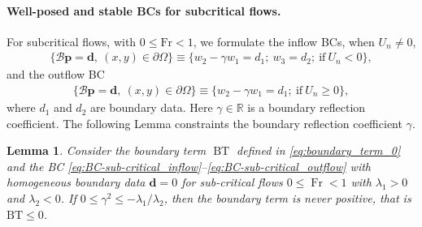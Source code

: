 \documentclass{article}
\numberwithin{equation}{section}
\newtheorem{lemma}{Lemma}
\theoremstyle{definition}
\begin{document}
\paragraph{Well-posed and stable BCs for subcritical flows.} For subcritical flows, with $0\le \mathrm{Fr}< 1$, we formulate the inflow BCs, when $U_n \ne 0$, 
%
%
    \begin{eqnarray}\label{eq:BC-sub-critical_inflow}
    \{\mathcal{B}\textbf{p}=\textbf{d},  \ (x,y) \in \partial \Omega \} \equiv \{ {w_2 - \gamma w_1 = d_1}; \ {w_3 = d_2}; \ \text{if} \ U_n < 0\},
    \end{eqnarray}
and the outflow BC
    \begin{eqnarray}\label{eq:BC-sub-critical_outflow}
    \{\mathcal{B}\textbf{p}=\textbf{d},  \ (x,y) \in \partial \Omega \} \equiv \{ {w_2 - \gamma w_1 = d_1};  \ \text{if} \ U_n \ge 0\},
    \end{eqnarray}
    where $d_1$ and $d_2$ are boundary data.
Here $\gamma \in \mathbb{R}$ is a boundary reflection coefficient. The following Lemma constraints the boundary reflection coefficient $\gamma$.
%
\begin{lemma}\label{Lem:BC-Sub-critical flow}
    Consider the boundary term $\operatorname{BT}$ defined in \eqref{eq:boundary_term_0} and the BC \eqref{eq:BC-sub-critical_inflow}--\eqref{eq:BC-sub-critical_outflow} with homogeneous boundary data $\mathbf{d} =0$ for sub-critical flows $ 0\le \operatorname{Fr} < 1$ with $\lambda_1 >0$ and $\lambda_2 <0$. If  $0\le \gamma^2 \le -\lambda_1/\lambda_2$, then the boundary term is never positive, that is $\mathrm{BT} \le 0$.
\end{lemma}
\end{document}
